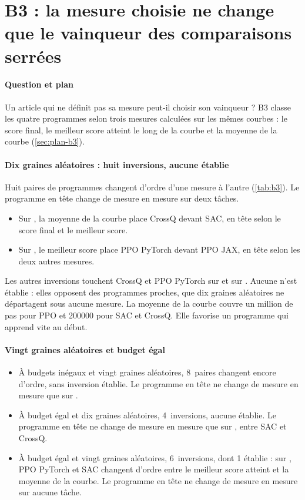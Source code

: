 \section{B3 : la mesure choisie ne change que le vainqueur des comparaisons serrées}\label{sec:b3}

\paragraph{Question et plan}
Un article qui ne définit pas sa mesure peut-il choisir son vainqueur ? B3 classe les quatre programmes selon
trois mesures calculées sur les mêmes courbes : le score final, le meilleur score atteint le long de la courbe
et la moyenne de la courbe (\cref{sec:plan-b3}).

\paragraph{Dix graines aléatoires : huit inversions, aucune établie}
Huit paires de programmes changent d'ordre d'une mesure à l'autre (\cref{tab:b3}). Le programme en tête change
de mesure en mesure sur deux tâches.
\begin{itemize}
  \item Sur , la moyenne de la courbe place CrossQ devant SAC, en tête selon le score final
    et le meilleur score.
  \item Sur , le meilleur score place PPO PyTorch devant PPO JAX, en tête selon les deux autres
    mesures.
\end{itemize}
Les autres inversions touchent CrossQ et PPO PyTorch sur  et sur . Aucune n'est
établie : elles opposent des programmes proches, que dix graines aléatoires ne départagent sous aucune mesure. La moyenne
de la courbe couvre un million de pas pour PPO et \num{200000} pour SAC et CrossQ. Elle favorise un programme
qui apprend vite au début.


\paragraph{Vingt graines aléatoires et budget égal}
\begin{itemize}
  \item À budgets inégaux et vingt graines aléatoires, 8~paires changent encore d'ordre, sans inversion établie. Le
    programme en tête ne change de mesure en mesure que sur .
  \item À budget égal et dix graines aléatoires, 4~inversions, aucune établie. Le programme en tête ne change de mesure
    en mesure que sur , entre SAC et CrossQ.
  \item À budget égal et vingt graines aléatoires, 6~inversions, dont 1 établie : sur , PPO PyTorch et SAC
    changent d'ordre entre le meilleur score atteint et la moyenne de la courbe. Le programme en tête ne change
    de mesure en mesure sur aucune tâche.
\end{itemize}

